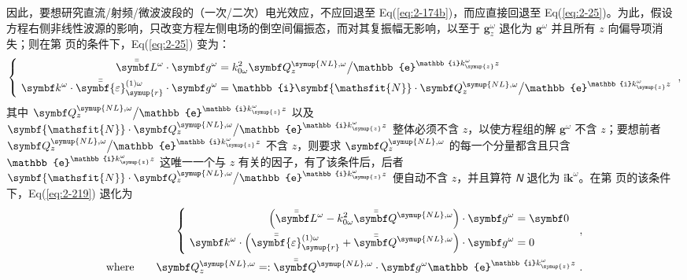 因此，要想研究直流/射频/微波波段的（一次/二次）电光效应，不应回退至 Eq(\ref{eq:2-174b})，而应直接回退至 Eq(\ref{eq:2-25})。为此，假设方程右侧非线性波源的影响，只改变方程左侧电场的倒空间偏振态，而对其复振幅无影响\label{con:5}，以至于 ${\symbf g^{\omega}_z}$ 退化为 ${\symbf g^{\omega}}$ 并且所有 $z$ 向偏导项消失；则在第 \pageref{con:1} 页的条件下，Eq(\ref{eq:2-25}) 变为：
\begin{equation} \label{eq:2-219}
	\left\{\ \begin{aligned} \bar{\bar{\symbf L}}^\omega \cdot {\symbf g^{\omega}} &= k^{2}_{0\omega} {\symbf Q^{{\symup{NL}},\omega}_z} \big/ \mathbb{e}^{\mathbb{i} k^\omega_{\symup{z}} z} \\ {\symbf k^\omega} \cdot \bar{\bar{\symbf{\varepsilon}}}_{\symup{r}}^{(1)\omega} \cdot {\symbf g^{\omega}} &= \mathbb{i} {\symbf{\mathsfit{N}}} \cdot {\symbf Q^{{\symup{NL}},\omega}_z} \big/ \mathbb{e}^{\mathbb{i} k^\omega_{\symup{z}} z} \end{aligned}\right. ~,
\end{equation}
其中 ${\symbf Q^{{\symup{NL}},\omega}_z} \big/ \mathbb{e}^{\mathbb{i} k^\omega_{\symup{z}} z}$ 以及 ${\symbf{\mathsfit{N}}} \cdot {\symbf Q^{{\symup{NL}},\omega}_z} \big/ \mathbb{e}^{\mathbb{i} k^\omega_{\symup{z}} z}$ 整体必须不含 $z$，以使方程组的解 ${\symbf g^{\omega}}$ 不含 $z$；要想前者 ${\symbf Q^{{\symup{NL}},\omega}_z} \big/ \mathbb{e}^{\mathbb{i} k^\omega_{\symup{z}} z}$ 不含 $z$，则要求 ${\symbf Q^{{\symup{NL}},\omega}_z}$ 的每一个分量都含且只含 $\mathbb{e}^{\mathbb{i} k^\omega_{\symup{z}} z}$ 这唯一一个与 $z$ 有关的因子，有了该条件后，后者 ${\symbf{\mathsfit{N}}} \cdot {\symbf Q^{{\symup{NL}},\omega}_z} \big/ \mathbb{e}^{\mathbb{i} k^\omega_{\symup{z}} z}$ 便自动不含 $z$，并且算符 ${\symbf{\mathsfit{N}}}$ 退化为 $\mathbb{i} {\symbf k^\omega}$。在第 \pageref{con:5} 页的该条件下，Eq(\ref{eq:2-219}) 退化为
\begin{subequations} \label{eq:2-220}
	\abovedisplayskip=13pt
	\belowdisplayskip=13pt
	\begin{align}
		\left\{\ \begin{aligned} \left( \bar{\bar{\symbf L}}^\omega - k^{2}_{0\omega} {\bar{\bar{\symbf Q}}^{{\symup{NL}},\omega}} \right) \cdot {\symbf g^{\omega}} &= \symbf 0 \\ {\symbf k^\omega} \cdot \left( \bar{\bar{\symbf{\varepsilon}}}_{\symup{r}}^{(1)\omega} + {\bar{\bar{\symbf Q}}^{{\symup{NL}},\omega}} \right) \cdot {\symbf g^{\omega}} &= 0 \end{aligned}\right. ~ \label{eq:2-220a}~, \\ \text{where}\ \ \ \ \ \ {\symbf Q^{{\symup{NL}},\omega}_z} =: {\bar{\bar{\symbf Q}}^{{\symup{NL}},\omega}} \cdot {\symbf g^{\omega}} \mathbb{e}^{\mathbb{i} k^\omega_{\symup{z}} z} \label{eq:2-220b}~.
	\end{align}
\end{subequations}

